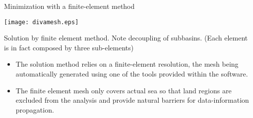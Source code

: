 
\begin{frame}{Minimization with a finite-element method}
\centerline{
\texttt{[image: divamesh.eps]}
}
Solution by finite element method. %
Note decoupling of subbasins. (Each element is in fact composed by three sub-elements) %
\begin{itemize}
\item The solution method relies on a finite-element resolution, the mesh being automatically generated using one of the tools provided within the software. 
\item The finite element mesh only covers actual sea so that land regions are excluded from the analysis and provide natural barriers for data-information propagation.
\end{itemize}
\end{frame}


